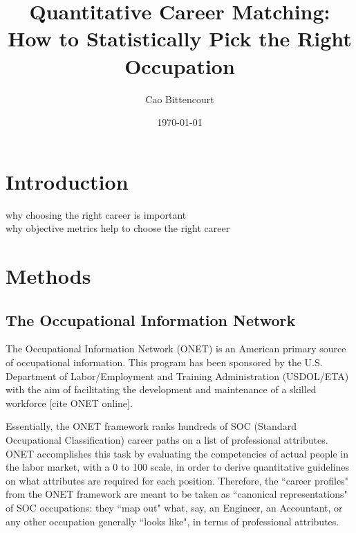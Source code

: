 \documentclass{article}
\title{Quantitative Career Matching: 
\\ How to Statistically Pick the Right Occupation}
\author{Cao Bittencourt}
\date{\today}
\begin{document}
\maketitle

\newpage

\begin{abstract}
   
\end{abstract}

\newpage
\tableofcontents

\newpage
\listoftables

\newpage
\section{Introduction}
why choosing the right career is important
\\ why objective metrics help to choose the right career 

\section{Methods}
\subsection{The Occupational Information Network}
The Occupational Information Network (ONET) is an American primary source of occupational information. This program has been sponsored by the U.S. Department of Labor/Employment and Training Administration (USDOL/ETA) with the aim of facilitating the development and maintenance of a skilled workforce [cite ONET online].

Essentially, the ONET framework ranks hundreds of SOC (Standard Occupational Classification) career paths on a list of professional attributes. ONET accomplishes this task by evaluating the competencies of actual people in the labor market, with a 0 to 100 scale, in order to derive quantitative guidelines on what attributes are required for each position. Therefore, the ``career profiles" from the ONET framework are meant to be taken as ``canonical representations" of SOC occupations: they ``map out" what, say, an Engineer, an Accountant, or any other occupation generally ``looks like", in terms of professional attributes.

\end{document}

